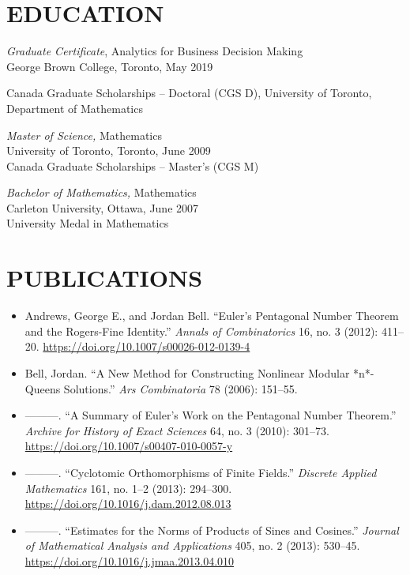 \documentclass[margin, 10pt]{res} %
\begin{document}
\begin{resume}
\section{EDUCATION}

{\sl Graduate Certificate}, Analytics for Business Decision Making \\
George Brown College, Toronto, May 2019

Canada Graduate Scholarships – Doctoral (CGS D), University of Toronto, Department of Mathematics

{\sl Master of Science,} Mathematics \\
University of Toronto, Toronto, June 2009\\
Canada Graduate Scholarships – Master's (CGS M)

{\sl Bachelor of Mathematics,} Mathematics \\
Carleton University, Ottawa, June 2007\\
University Medal in Mathematics



\section{PUBLICATIONS}



\begin{itemize}
\item Andrews, George E., and Jordan Bell. “Euler’s Pentagonal Number Theorem and the Rogers-Fine Identity.” {\em Annals of Combinatorics} 16, no. 3 (2012): 411–20. \url{https://doi.org/10.1007/s00026-012-0139-4}

\item Bell, Jordan. “A New Method for Constructing Nonlinear Modular *n*-Queens Solutions.” {\em Ars Combinatoria} 78 (2006): 151–55.

\item ———. “A Summary of Euler’s Work on the Pentagonal Number Theorem.” {\em Archive for History of Exact Sciences} 64, no. 3 (2010): 301–73. \url{https://doi.org/10.1007/s00407-010-0057-y}

\item ———. “Cyclotomic Orthomorphisms of Finite Fields.” {\em Discrete Applied Mathematics} 161, no. 1–2 (2013): 294–300. \url{https://doi.org/10.1016/j.dam.2012.08.013}

\item ———. “Estimates for the Norms of Products of Sines and Cosines.” {\em Journal of Mathematical Analysis and Applications} 405, no. 2 (2013): 530–45. \url{https://doi.org/10.1016/j.jmaa.2013.04.010}


\end{itemize}
\end{resume}
\end{document}
